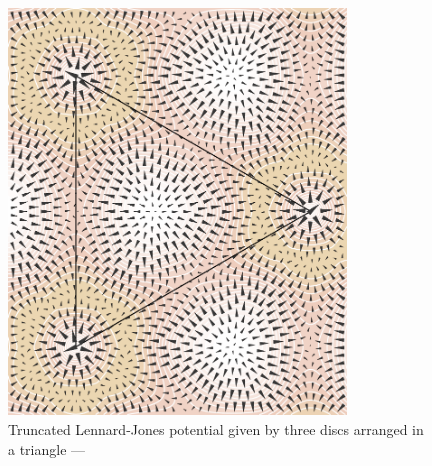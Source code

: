 \documentclass[12pt]{article}
\begin{document}
  \thispagestyle{empty}
  \begin{figure}
    \begin{center}
      \includegraphics[width=0.8\textwidth]{compose.pdf}
    \end{center}
    \caption*{Truncated Lennard-Jones potential given by three
      discs arranged in a triangle --- \vfplotversion}
  \end{figure}
\end{document}
